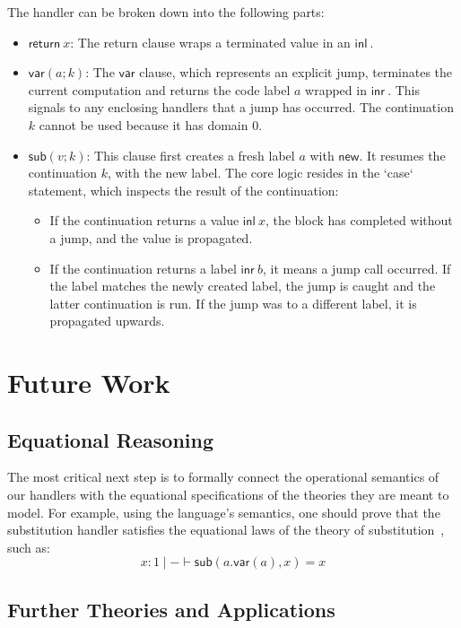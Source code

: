 \documentclass{article}
\theoremstyle{definition}
\theoremstyle{remark}
\newcommand\new{\mathsf{new}}
\newcommand\ret[1]{{\mathsf{return} \ #1}}
\newcommand\sub{\mathsf{sub}}
\newcommand\var{\mathsf{var}}
\newcommand\inl[1]{{\mathsf{inl} \ #1}}
\newcommand\inr[1]{{\mathsf{inr} \ #1}}
\begin{document}
The handler can be broken down into the following parts:
\begin{itemize}
    \item $\ret{x}$: The return clause wraps a terminated value in an $\inl{}$.
    \item $\var(a; k)$: The $\var$ clause, which represents an explicit jump, terminates the current computation and returns the code label $a$ wrapped in $\inr{}$.
      This signals to any enclosing handlers that a jump has occurred. The continuation $k$ cannot be used because it has domain $0$.
    \item $\sub(v; k)$: This clause first creates a fresh label $a$ with $\new$. It resumes the continuation $k$, with the new label.
      The core logic resides in the `case` statement, which inspects the result of the continuation:
      \begin{itemize}
          \item If the continuation returns a value $\inl x$, the block has completed without a jump, and the value is propagated.
          \item If the continuation returns a label $\inr b$, it means a jump call occurred. If the label matches the newly created label, the jump is caught and the latter continuation is run.
            If the jump was to a different label, it is propagated upwards.
      \end{itemize}
\end{itemize}

\section{Future Work}

\subsection{Equational Reasoning}

The most critical next step is to formally connect the operational semantics of our handlers with the equational specifications of the theories they are meant to model.
For example, using the language's semantics, one should prove that the substitution handler satisfies the equational laws of the theory of substitution~\cite{fiore_substitution_2014}, such as:
\[
  x:1 \mid - \vdash \sub(a.\var(a), x) = x
\]

\subsection{Further Theories and Applications}
\end{document}

